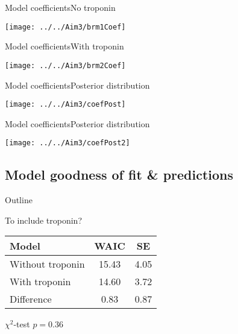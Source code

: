 \documentclass[xcolor=dvipsnames]{beamer}
\begin{document}
\begin{frame}{Model coefficients}{No troponin}
\vspace{-5pt}
\begin{center}
\texttt{[image: ../../Aim3/brm1Coef]}
\end{center}
\end{frame}

\begin{frame}{Model coefficients}{With troponin}
\vspace{-5pt}
\begin{center}
\texttt{[image: ../../Aim3/brm2Coef]}
\end{center}
\end{frame}

\begin{frame}{Model coefficients}{Posterior distribution}
\vspace{-5pt}
\begin{center}
\texttt{[image: ../../Aim3/coefPost]}
\end{center}
\end{frame}

\begin{frame}{Model coefficients}{Posterior distribution}
\vspace{-5pt}
\begin{center}
\texttt{[image: ../../Aim3/coefPost2]}
\end{center}
\end{frame}

\subsection{Model goodness of fit \& predictions}
\begin{frame}{Outline}
\vspace{-10.5pt}
\tableofcontents[currentsection,subsectionstyle=show/shaded/hide]
\end{frame}

\begin{frame}{To include troponin?}
\vspace{-10.5pt}
\begin{center}
\begin{tabular}{lcc}
\hline
Model & WAIC  & SE \\
\hline
Without troponin & 15.43 & 4.05 \\ 
With troponin & 14.60 & 3.72 \\
Difference & 0.83 & 0.87 \\
\hline
\end{tabular}

$\chi^2$-test $p=0.36$
\end{center}
\end{frame}
\end{document}
